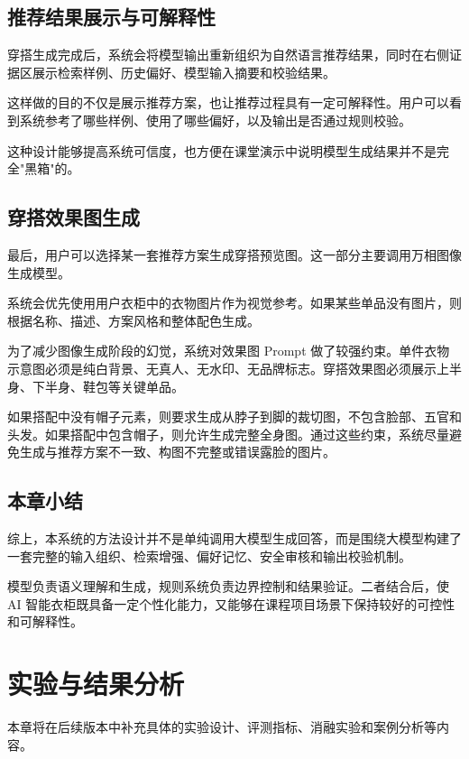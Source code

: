 \documentclass{applemlr}
\begin{document}
\subsection{推荐结果展示与可解释性}

穿搭生成完成后，系统会将模型输出重新组织为自然语言推荐结果，同时在右侧证据区展示检索样例、历史偏好、模型输入摘要和校验结果。

这样做的目的不仅是展示推荐方案，也让推荐过程具有一定可解释性。用户可以看到系统参考了哪些样例、使用了哪些偏好，以及输出是否通过规则校验。

这种设计能够提高系统可信度，也方便在课堂演示中说明模型生成结果并不是完全"黑箱"的。

\subsection{穿搭效果图生成}

最后，用户可以选择某一套推荐方案生成穿搭预览图。这一部分主要调用万相图像生成模型。

系统会优先使用用户衣柜中的衣物图片作为视觉参考。如果某些单品没有图片，则根据名称、描述、方案风格和整体配色生成。

为了减少图像生成阶段的幻觉，系统对效果图 Prompt 做了较强约束。单件衣物示意图必须是纯白背景、无真人、无水印、无品牌标志。穿搭效果图必须展示上半身、下半身、鞋包等关键单品。

如果搭配中没有帽子元素，则要求生成从脖子到脚的裁切图，不包含脸部、五官和头发。如果搭配中包含帽子，则允许生成完整全身图。通过这些约束，系统尽量避免生成与推荐方案不一致、构图不完整或错误露脸的图片。

\subsection{本章小结}

综上，本系统的方法设计并不是单纯调用大模型生成回答，而是围绕大模型构建了一套完整的输入组织、检索增强、偏好记忆、安全审核和输出校验机制。

模型负责语义理解和生成，规则系统负责边界控制和结果验证。二者结合后，使 AI 智能衣柜既具备一定个性化能力，又能够在课程项目场景下保持较好的可控性和可解释性。


\section{实验与结果分析}
\label{sec:experiments}

本章将在后续版本中补充具体的实验设计、评测指标、消融实验和案例分析等内容。
\end{document}
